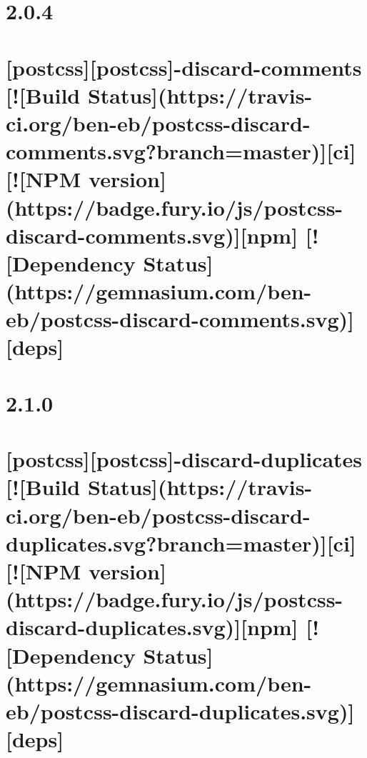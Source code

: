 \documentclass[twoside]{book}
\newcommand{\+}{\discretionary{\mbox{\scriptsize$\hookleftarrow$}}{}{}}
\begin{document}
\chapter{2.0.4}
\label{md__c_1_workspace_demo_src_main_script_node_modules_postcss-discard-comments__c_h_a_n_g_e_l_o_g}

\chapter{\mbox{[}postcss\mbox{]}\mbox{[}postcss\mbox{]}-\/discard-\/comments \mbox{[}!\mbox{[}Build Status\mbox{]}(https\+://travis-\/ci.org/ben-\/eb/postcss-\/discard-\/comments.svg?branch=master)\mbox{]}\mbox{[}ci\mbox{]} \mbox{[}!\mbox{[}N\+PM version\mbox{]}(https\+://badge.fury.\+io/js/postcss-\/discard-\/comments.svg)\mbox{]}\mbox{[}npm\mbox{]} \mbox{[}!\mbox{[}Dependency Status\mbox{]}(https\+://gemnasium.com/ben-\/eb/postcss-\/discard-\/comments.svg)\mbox{]}\mbox{[}deps\mbox{]}}
\label{md__c_1_workspace_demo_src_main_script_node_modules_postcss-discard-comments__r_e_a_d_m_e}

\chapter{2.1.0}
\label{md__c_1_workspace_demo_src_main_script_node_modules_postcss-discard-duplicates__c_h_a_n_g_e_l_o_g}

\chapter{\mbox{[}postcss\mbox{]}\mbox{[}postcss\mbox{]}-\/discard-\/duplicates \mbox{[}!\mbox{[}Build Status\mbox{]}(https\+://travis-\/ci.org/ben-\/eb/postcss-\/discard-\/duplicates.svg?branch=master)\mbox{]}\mbox{[}ci\mbox{]} \mbox{[}!\mbox{[}N\+PM version\mbox{]}(https\+://badge.fury.\+io/js/postcss-\/discard-\/duplicates.svg)\mbox{]}\mbox{[}npm\mbox{]} \mbox{[}!\mbox{[}Dependency Status\mbox{]}(https\+://gemnasium.com/ben-\/eb/postcss-\/discard-\/duplicates.svg)\mbox{]}\mbox{[}deps\mbox{]}}
\label{md__c_1_workspace_demo_src_main_script_node_modules_postcss-discard-duplicates__r_e_a_d_m_e}

\end{document}

